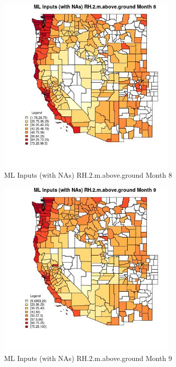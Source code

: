 \begin{figure} 
\centering  
\includegraphics[width=0.77\textwidth]{Code_Outputs/Report_ML_input_PM25_Step4_part_f_de_duplicated_aveswNAs_CountyRH2mabovegroundmedianMonth8.jpg} 
\caption{\label{fig:Report_ML_input_PM25_Step4_part_f_de_duplicated_aveswNAsCountyRH2mabovegroundmedianMonth8}ML Inputs (with NAs) RH.2.m.above.ground Month 8} 
\end{figure} 
 

\begin{figure} 
\centering  
\includegraphics[width=0.77\textwidth]{Code_Outputs/Report_ML_input_PM25_Step4_part_f_de_duplicated_aveswNAs_CountyRH2mabovegroundmedianMonth9.jpg} 
\caption{\label{fig:Report_ML_input_PM25_Step4_part_f_de_duplicated_aveswNAsCountyRH2mabovegroundmedianMonth9}ML Inputs (with NAs) RH.2.m.above.ground Month 9} 
\end{figure} 
 

